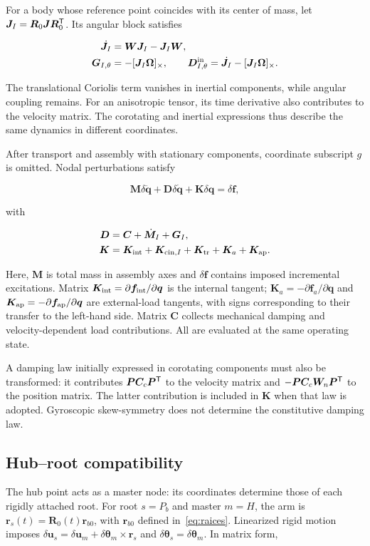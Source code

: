 For a body whose reference point coincides with its center of mass, let $\bm J_I=\bm R_0\bm J\bm R_0^\mathsf T$. Its angular block satisfies

\begin{align}
\dot{\bm J}_I&=\bm W\bm J_I-\bm J_I\bm W,\nonumber\\
\bm G_{I,\theta}&=-[\bm J_I\bm\Omega]_\times,\qquad
\bm D_{I,\theta}^{\rm in}=\dot{\bm J}_I-[\bm J_I\bm\Omega]_\times.
\end{align}

The translational Coriolis term vanishes in inertial components, while angular coupling remains. For an anisotropic tensor, its time derivative also contributes to the velocity matrix. The corotating and inertial expressions thus describe the same dynamics in different coordinates.

After transport and assembly with stationary components, coordinate subscript $g$ is omitted. Nodal perturbations satisfy

\begin{equation}
\bm M\delta\ddot{\bm q}+\bm D\delta\dot{\bm q}
+\bm K\delta\bm q=\delta\bm f,
\label{eq:fullsystem}
\end{equation}

with

\begin{align}
\bm D&=\bm C+\dot{\bm M}_I+\bm G_I,\nonumber\\
\bm K&=\bm K_{\rm int}+\bm K_{{\rm cin},I}
+\bm K_{\rm tr}+\bm K_a+\bm K_{\rm ap}.
\end{align}

Here, $\bm M$ is total mass in assembly axes and $\delta\bm f$ contains imposed incremental excitations. Matrix $\bm K_{\rm int}=\partial\bm f_{\rm int}/\partial\bm q$ is the internal tangent; $\bm K_a=-\partial\bm f_a/\partial\bm q$ and $\bm K_{\rm ap}=-\partial\bm f_{\rm ap}/\partial\bm q$ are external-load tangents, with signs corresponding to their transfer to the left-hand side. Matrix $\bm C$ collects mechanical damping and velocity-dependent load contributions. All are evaluated at the same operating state.

A damping law initially expressed in corotating components must also be transformed: it contributes $\bm P\bm C_c\bm P^\mathsf T$ to the velocity matrix and $-\bm P\bm C_c\bm W_n\bm P^\mathsf T$ to the position matrix. The latter contribution is included in $\bm K$ when that law is adopted. Gyroscopic skew-symmetry does not determine the constitutive damping law.

\subsection{Hub--root compatibility}
The hub point acts as a master node: its coordinates determine those of each rigidly attached root. For root $s=P_b$ and master $m=H$, the arm is $\bm r_s(t)=\bm R_0(t)\bm r_{b0}$, with $\bm r_{b0}$ defined in~\eqref{eq:raices}. Linearized rigid motion imposes $\delta\bm u_s=\delta\bm u_m+\delta\bm\theta_m\times\bm r_s$ and $\delta\bm\theta_s=\delta\bm\theta_m$. In matrix form,

